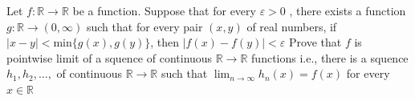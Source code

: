 Let \(f\colon \mathbb{R}\to \mathbb{R}\) be a function. Suppose that for every \(\varepsilon >0\) , there exists a function \(g\colon \mathbb{R}\to (0,\infty)\) such that for every pair \((x,y)\) of real numbers,
if \(|x-y|<\text{min}\{g(x),g(y)\}\), then \(|f(x)-f(y)|<\varepsilon\)
Prove that \(f\) is pointwise limit of a squence of continuous \(\mathbb{R}\to \mathbb{R}\) functions i.e., there is a squence \(h_1,h_2,\dots,\) of continuous \(\mathbb{R}\to \mathbb{R}\) such that \(\lim_{n\to \infty}h_n(x)=f(x)\) for every \(x\in \mathbb{R}\)